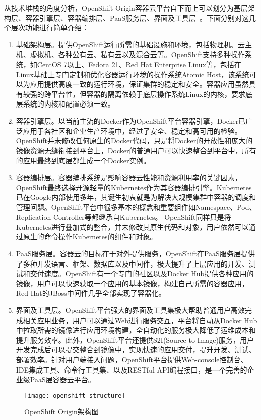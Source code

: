 从技术堆栈的角度分析，OpenShift Origin容器云平台自下而上可以划分为基层架构层、容器引擎层、容器编排层、PaaS服务层、界面及工具层~\cite{2017Kubernetes}。下面分别对这几个层次功能进行简单介绍：
\begin{enumerate}[1.]
	\item 基础架构层。提供OpenShift运行所需的基础设施和环境，包括物理机、云主机、虚拟机、各种公有云、私有云以及混合云等。OpenShift支持多种操作系统，如CentOS 7以上、Fedora 21、Red Hat Enterprise Linux等，包括在Linux基础上专门定制和优化容器运行环境的操作系统Atomic Host，该系统可以为应用提供高度一致的运行环境，保证集群的稳定和安全。容器应用虽然具有较强的跨平台性，但容器的隔离依赖于底层操作系统Linux的内核，要求底层系统的内核和配置必须一致。
	\item 容器引擎层。以当前主流的Docker作为OpenShift平台容器引擎，Docker已广泛应用于各社区和企业生产环境中，经过了安全、稳定和高可用的检验。OpenShift并未修改任何原生的Docker代码，只是将Docker的开放性和庞大的镜像资源无缝衔接到平台上，Docker的普通用户可以快速整合到平台中，所有的应用最终到底层都生成一个Docker实例。
	\item 容器编排层。容器编排系统是影响容器云性能和资源利用率的关键因素，OpenShift最终选择开源轻量的Kubernetes作为其容器编排引擎。Kubernetes已在Google内部使用多年，其诞生初衷就是为解决大规模集群中容器的调度和管理问题。OpenShift平台中很多基本的概念和重要组件如Namespace、Pod、Replication Controller等都继承自Kubernetes。
	OpenShift同样只是将Kubernetes进行叠加式的整合，并未修改其原生代码和对象，用户依然可以通过原生的命令操作Kubernetes的组件和对象。
	\item PaaS服务层。容器云的目标在于对外提供服务，OpenShift在PaaS服务层提供了多种开发语言、框架、数据库以及中间件，极大提升了上层应用的开发、测试和交付速度。OpenShift有一个专门的社区以及Docker Hub提供各种应用的镜像，用户可以快速获取一个应用的基本镜像，构建自己所需的容器应用，Red Hat的JBoss中间件几乎全部实现了容器化。
	\item 界面及工具层。OpenShift平台强大的界面及工具集极大帮助普通用户高效完成相关应用业务，用户可以通过Web进行服务交互，平台将自动从Docker Hub中拉取所需的镜像进行应用环境构建，全自动化的服务极大降低了运维成本和提升服务效率。此外，OpenShift平台还提供S2I(Source to Image)服务，用户开发完成后可以提交整合到镜像中，实现快速的应用交付，提升开发、测试、部署效率。针对用户端接入问题，OpenShift平台提供Web-console控制台、IDE集成工具、命令行工具集、以及RESTful API编程接口，是一个完善的企业级PaaS层容器云平台。
\end{enumerate}
\begin{figure}[H] %
	\centering
	\texttt{[image: openshift-structure]}
	\caption{OpenShift Origin架构图}
\end{figure}

